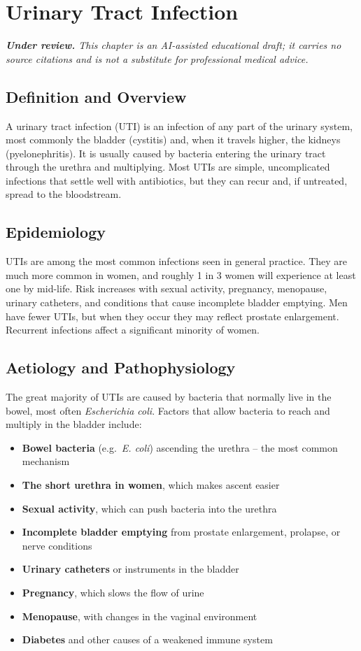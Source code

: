 \chapter{Urinary Tract Infection}

\medskip
\noindent\textit{\textbf{Under review.} This chapter is an AI-assisted educational draft; it carries no source citations and is not a substitute for professional medical advice.}

\section*{Definition and Overview}
A urinary tract infection (UTI) is an infection of any part of the urinary system, most commonly the bladder (cystitis) and, when it travels higher, the kidneys (pyelonephritis). It is usually caused by bacteria entering the urinary tract through the urethra and multiplying. Most UTIs are simple, uncomplicated infections that settle well with antibiotics, but they can recur and, if untreated, spread to the bloodstream.

\section*{Epidemiology}
UTIs are among the most common infections seen in general practice. They are much more common in women, and roughly 1 in 3 women will experience at least one by mid-life. Risk increases with sexual activity, pregnancy, menopause, urinary catheters, and conditions that cause incomplete bladder emptying. Men have fewer UTIs, but when they occur they may reflect prostate enlargement. Recurrent infections affect a significant minority of women.

\section*{Aetiology and Pathophysiology}
The great majority of UTIs are caused by bacteria that normally live in the bowel, most often \textit{Escherichia coli}. Factors that allow bacteria to reach and multiply in the bladder include:

\begin{itemize}
    \item \textbf{Bowel bacteria} (e.g.\ \textit{E. coli}) ascending the urethra -- the most common mechanism
    \item \textbf{The short urethra in women}, which makes ascent easier
    \item \textbf{Sexual activity}, which can push bacteria into the urethra
    \item \textbf{Incomplete bladder emptying} from prostate enlargement, prolapse, or nerve conditions
    \item \textbf{Urinary catheters} or instruments in the bladder
    \item \textbf{Pregnancy}, which slows the flow of urine
    \item \textbf{Menopause}, with changes in the vaginal environment
    \item \textbf{Diabetes} and other causes of a weakened immune system
\end{itemize}

